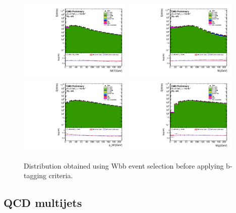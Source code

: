 \begin{figure}[htbp]
	\centering
		\includegraphics[width=0.48\textwidth]{Figures/Results/noBtag/Wbb_GetMET_doQCD1.pdf}
		\includegraphics[width=0.48\textwidth]{Figures/Results/noBtag/Wbb_GetVMt_doQCD1.pdf}
		\includegraphics[width=0.48\textwidth]{Figures/Results/noBtag/Wbb_GetWpt_doQCD1.pdf}
		\includegraphics[width=0.48\textwidth]{Figures/Results/noBtag/Wbb_H_mass_doQCD1.pdf}		
	\caption[Distribution obtained using Wbb event selection before applying b-tagging criteria.]{Distribution obtained using Wbb event selection before applying b-tagging criteria.}
	\label{fig:Wjets}
\end{figure}

\subsection{QCD multijets}
\label{sec:QCD}

